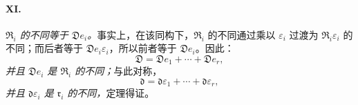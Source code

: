 \paragraph{XI.}
\emph{$\mathfrak R_i$ 的不同等于 $\mathfrak D e_i$。}事实上，在该同构下，$\mathfrak R_i$ 的不同通过乘以 $\varepsilon_i$ 过渡为 $\mathfrak R_i\varepsilon_i$ 的不同；而后者等于 $\mathfrak D e_i\varepsilon_i$，所以前者等于 $\mathfrak D e_i$。因此：
\[
\mathfrak D=\mathfrak D e_1+\cdots+\mathfrak D e_r,
\]
\emph{并且 $\mathfrak D e_i$ 是 $\mathfrak R_i$ 的不同；}与此对称，
\[
\mathfrak d=\mathfrak d\varepsilon_1+\cdots+\mathfrak d\varepsilon_r,
\]
\emph{并且 $\mathfrak d\varepsilon_i$ 是 $\mathfrak r_i$ 的不同，}定理得证。
